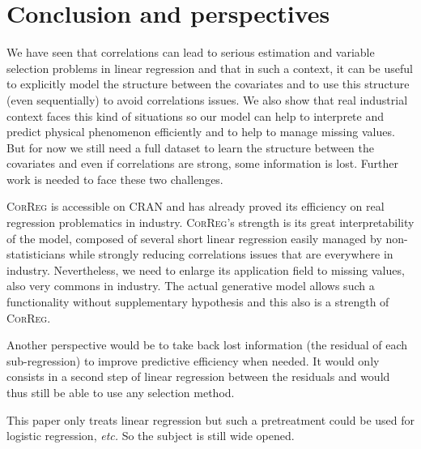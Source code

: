 \documentclass[11pt,a4paper]{article}
\begin{document}
\section{Conclusion and perspectives}
	We have seen that correlations can lead to serious estimation and variable selection problems in linear regression and that in such a context, it can be useful to explicitly model the structure between the covariates and to use this structure (even sequentially) to avoid correlations issues. We also show that real industrial context faces this kind of situations so our model can help to interprete and predict physical phenomenon efficiently and to help to manage missing values. But for now we still need a full dataset to learn the structure between the covariates and even if correlations are strong, some information is lost. Further work is needed to face these two challenges.
	
	\textsc{CorReg} is accessible on CRAN and has already proved its efficiency on real regression problematics in industry. \textsc{CorReg}'s strength is its great interpretability of the model, composed of several short linear regression easily managed by non-statisticians while strongly reducing correlations issues that are everywhere in industry.
	Nevertheless, we need to enlarge its application field to missing values, also very commons in industry. The actual generative model allows such a functionality without supplementary hypothesis and this also is a strength of \textsc{CorReg}. 
	
	Another perspective would be to take back lost information (the residual of each sub-regression) to improve predictive efficiency when needed. It would only consists in a second step of linear regression between the residuals and would thus still be able to use any selection method.
	
	This paper only treats linear regression but such a pretreatment could be used for logistic regression, {\it etc.}
	So the subject is still wide opened.	
	
{}

\end{document}
